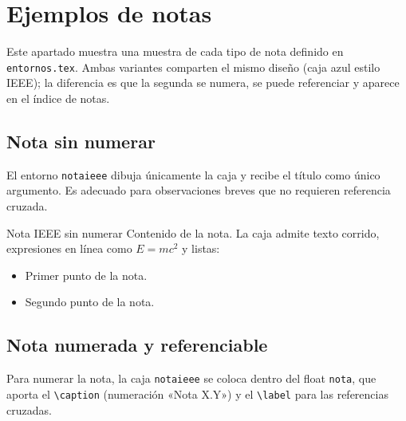 %
\section{Ejemplos de notas}
\label{sec:ej-notas}

Este apartado muestra una muestra de cada tipo de nota definido en \texttt{entornos.tex}. Ambas variantes comparten el mismo diseño (caja azul estilo IEEE); la diferencia es que la segunda se numera, se puede referenciar y aparece en el índice de notas.

\subsection{Nota sin numerar}
\label{subsec:ej-nota-simple}

El entorno \texttt{notaieee} dibuja únicamente la caja y recibe el título como único argumento. Es adecuado para observaciones breves que no requieren referencia cruzada.

\begin{notaieee}{Nota IEEE sin numerar}
Contenido de la nota. La caja admite texto corrido, expresiones en línea como $E = mc^2$ y listas:
\begin{itemize}
  \item Primer punto de la nota.
  \item Segundo punto de la nota.
\end{itemize}
\end{notaieee}

\subsection{Nota numerada y referenciable}
\label{subsec:ej-nota-numerada}

Para numerar la nota, la caja \texttt{notaieee} se coloca dentro del float \texttt{nota}, que aporta el \texttt{\textbackslash caption} (numeración «Nota X.Y») y el \texttt{\textbackslash label} para las referencias cruzadas.

